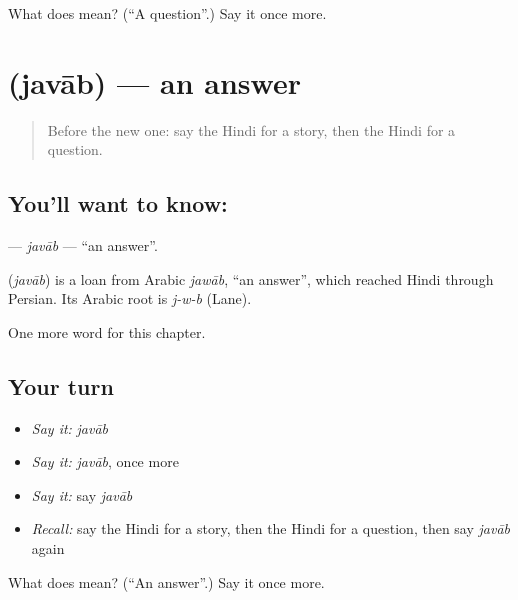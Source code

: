 \begin{tcolorbox}[breakable,colback=teal!4,colframe=teal!35!black,title={Before you move on}]
What does  mean? (\textquotedblleft{}A question\textquotedblright{}.) Say it once more.
\end{tcolorbox}
\section[\texorpdfstring{\hi{जवाब} (javāb)}{जवाब (javāb)}]{ (javāb) — an answer}

\label{lesson:HI-C189-javab}



\begin{quote}
Before the new one: say the Hindi for a story, then the Hindi for a question.
\end{quote}

\subsection*{You'll want to know: }
\textbf{} — \emph{javāb} — \textquotedblleft{}an answer\textquotedblright{}.

\begin{cousinweb}
\textbf{} (\emph{javāb}) is a loan from Arabic \emph{jawāb}, \textquotedblleft{}an answer\textquotedblright{}, which reached Hindi through Persian. Its Arabic root is \emph{j-w-b} (Lane).
\end{cousinweb}

\begin{grammarlens}[title={What you've built}]
One more word for this chapter.
\end{grammarlens}

\subsection*{Your turn}
\begin{itemize}
\raggedright
  \item \emph{Say it:} \emph{javāb}
  \item \emph{Say it:} \emph{javāb}, once more
  \item \emph{Say it:} say \emph{javāb}
  \item \emph{Recall:} say the Hindi for a story, then the Hindi for a question, then say \emph{javāb} again
\end{itemize}

\begin{tcolorbox}[breakable,colback=teal!4,colframe=teal!35!black,title={Before you move on}]
What does  mean? (\textquotedblleft{}An answer\textquotedblright{}.) Say it once more.
\end{tcolorbox}
